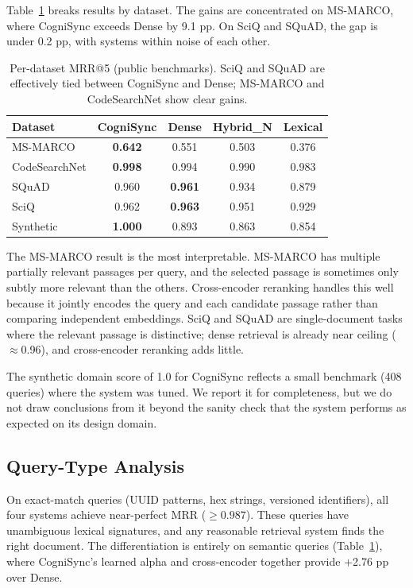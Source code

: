 \documentclass[sigconf]{acmart}
\begin{document}
Table~\ref{tab} breaks results by dataset. The gains are
concentrated on MS-MARCO, where CogniSync exceeds Dense by 9.1 pp. On SciQ
and SQuAD, the gap is under 0.2 pp, with systems within noise of each other.

\begin{table}[t]
\centering
\caption{Per-dataset MRR@5 (public benchmarks). SciQ and SQuAD are effectively
tied between CogniSync and Dense; MS-MARCO and CodeSearchNet show clear gains.}
\label{tab}
\begin{tabular}{lcccc}
\toprule
Dataset & CogniSync & Dense & Hybrid_N & Lexical \\
\midrule
MS-MARCO & \textbf{0.642} & 0.551 & 0.503 & 0.376 \\
CodeSearchNet & \textbf{0.998} & 0.994 & 0.990 & 0.983 \\
SQuAD & 0.960 & \textbf{0.961} & 0.934 & 0.879 \\
SciQ & 0.962 & \textbf{0.963} & 0.951 & 0.929 \\
\midrule
Synthetic & \textbf{1.000} & 0.893 & 0.863 & 0.854 \\
\bottomrule
\end{tabular}
\end{table}

The MS-MARCO result is the most interpretable. MS-MARCO has multiple partially
relevant passages per query, and the selected passage is sometimes only subtly
more relevant than the others. Cross-encoder reranking handles this well because
it jointly encodes the query and each candidate passage rather than comparing
independent embeddings. SciQ and SQuAD are single-document tasks where the
relevant passage is distinctive; dense retrieval is already near ceiling
($\approx$0.96), and cross-encoder reranking adds little.

The synthetic domain score of 1.0 for CogniSync reflects a small benchmark
(408 queries) where the system was tuned. We report it for completeness, but
we do not draw conclusions from it beyond the sanity check that the system
performs as expected on its design domain.

\subsection{Query-Type Analysis}

On exact-match queries (UUID patterns, hex strings, versioned identifiers), all
four systems achieve near-perfect MRR ($\geq 0.987$). These queries have
unambiguous lexical signatures, and any reasonable retrieval system finds the
right document. The differentiation is entirely on semantic queries
(Table~\ref{tab}), where CogniSync's learned alpha and cross-encoder
together provide $+$2.76 pp over Dense.
\end{document}
